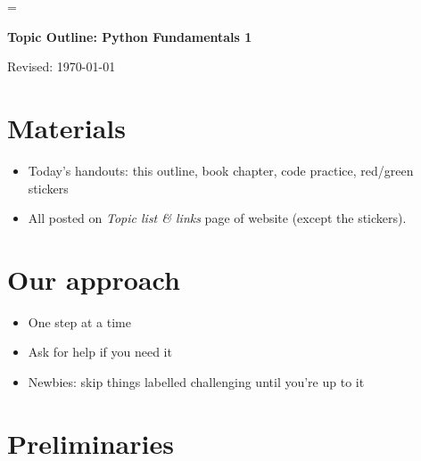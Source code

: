 \documentclass[11pt]{article}
\begin{document}
\parskip=\bigskipamount
\parindent=0.0in
\thispagestyle{empty}


\bigskip\bigskip
\centerline{\Large \bf Topic Outline:  Python Fundamentals 1}
\centerline{Revised: \today}


\section*{Materials}

\begin{itemize}
\item  Today's handouts:  this outline, book chapter, code practice, red/green stickers
\item  All posted on {\it Topic list \& links\/} page of website (except the stickers).
\end{itemize}


\section*{Our approach}

\begin{itemize}
\item One step at a time
\item Ask for help if you need it
\item Newbies:  skip things labelled challenging until you're up to it
\end{itemize}


\section*{Preliminaries}
\end{document}

